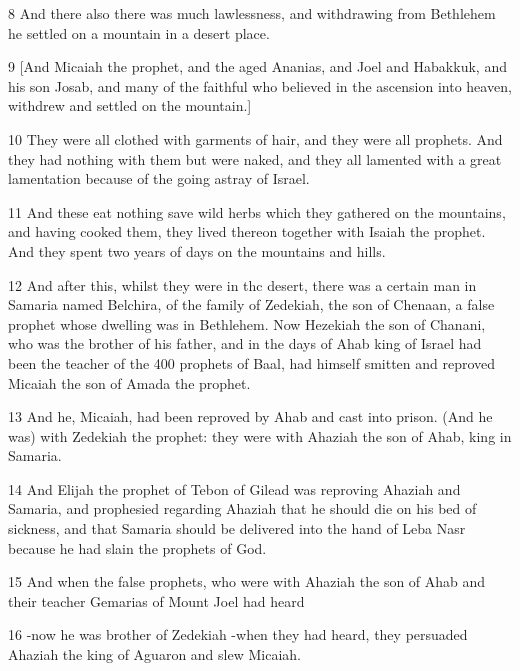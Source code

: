 \par 8 And there also there was much lawlessness, and withdrawing from Bethlehem he settled on a mountain in a desert place.

\par 9 [And Micaiah the prophet, and the aged Ananias, and Joel and Habakkuk, and his son Josab, and many of the faithful who believed in the ascension into heaven, withdrew and settled on the mountain.]

\par 10 They were all clothed with garments of hair, and they were all prophets. And they had nothing with them but were naked, and they all lamented with a great lamentation because of the going astray of Israel.

\par 11 And these eat nothing save wild herbs which they gathered on the mountains, and having cooked them, they lived thereon together with Isaiah the prophet. And they spent two years of days on the mountains and hills.

\par 12 And after this, whilst they were in thc desert, there was a certain man in Samaria named Belchira, of the family of Zedekiah, the son of Chenaan, a false prophet whose dwelling was in Bethlehem. Now Hezekiah the son of Chanani, who was the brother of his father, and in the days of Ahab king of Israel had been the teacher of the 400 prophets of Baal, had himself smitten and reproved Micaiah the son of Amada the prophet.

\par 13 And he, Micaiah, had been reproved by Ahab and cast into prison. (And he was) with Zedekiah the prophet: they were with Ahaziah the son of Ahab, king in Samaria.

\par 14 And Elijah the prophet of Tebon of Gilead was reproving Ahaziah and Samaria, and prophesied regarding Ahaziah that he should die on his bed of sickness, and that Samaria should be delivered into the hand of Leba Nasr because he had slain the prophets of God.

\par 15 And when the false prophets, who were with Ahaziah the son of Ahab and their teacher Gemarias of Mount Joel had heard

\par 16 -now he was brother of Zedekiah -when they had heard, they persuaded Ahaziah the king of Aguaron and slew Micaiah.

